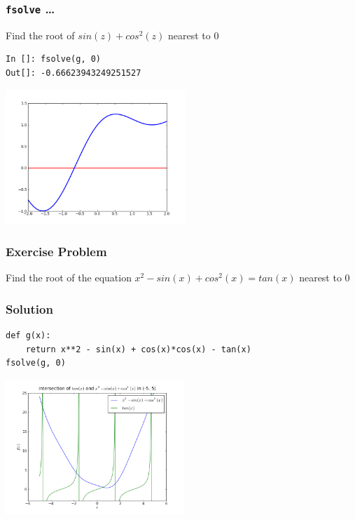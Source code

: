 \documentclass[14pt,compress]{beamer}
\newcommand{\typ}[1]{\lstinline{#1}}
\begin{document}
\begin{frame}[fragile]
\frametitle{\typ{fsolve} \ldots}
Find the root of $sin(z)+cos^2(z)$ nearest to $0$
\begin{lstlisting}
In []: fsolve(g, 0)
Out[]: -0.66623943249251527
\end{lstlisting}
\begin{center}
\includegraphics[height=2in, interpolate=true]{data/fsolve}    
\end{center}
\end{frame}

\begin{frame}[fragile]
  \frametitle{Exercise Problem}
  Find the root of the equation $x^2 - sin(x) + cos^2(x) = tan(x)$ nearest to $0$
\end{frame}

\begin{frame}[fragile]
  \frametitle{Solution}
  \begin{small}
  \begin{lstlisting}
def g(x):
    return x**2 - sin(x) + cos(x)*cos(x) - tan(x)
fsolve(g, 0)
  \end{lstlisting}
  \end{small}
  \begin{center}
\includegraphics[height=2in, interpolate=true]{data/fsolve_tanx}
  \end{center}
\end{frame}

\end{document}
